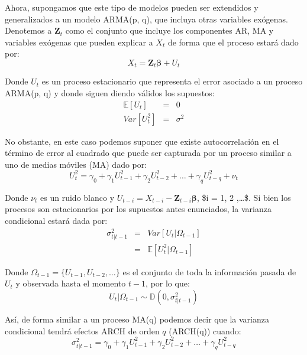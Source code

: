 \documentclass[
]{book}
\begin{document}
Ahora, supongamos que este tipo de modelos pueden ser extendidos y generalizados a un modelo ARMA(p, q), que incluya otras variables exógenas. Denotemos a \(\mathbf{Z}_t\) como el conjunto que incluye los componentes AR, MA y variables exógenas que pueden explicar a \(X_t\) de forma que el proceso estará dado por:
\begin{equation}
    X_t = \mathbf{Z}_t \boldsymbol{\beta} + U_t
\end{equation}

Donde \(U_t\) es un proceso estacionario que representa el error asociado a un proceso ARMA(p, q) y donde siguen diendo válidos los supuestos:
\begin{eqnarray*}
    \mathbb{E}[U_t] & = & 0 \\
    Var[U_t^2] & = & \sigma^2
\end{eqnarray*}

No obstante, en este caso podemos suponer que existe autocorrelación en el término de error al cuadrado que puede ser capturada por un proceso similar a uno de medias móviles (MA) dado por:
\begin{equation}
    U_t^2 = \gamma_0 + \gamma_1 U_{t-1}^2 + \gamma_2 U_{t-2}^2 + \ldots + \gamma_q U_{t-q}^2 + \nu_t
\end{equation}

Donde \(\nu_t\) es un ruido blanco y \(U_{t-i} = X_{t-i} - \mathbf{Z}_{t-i} \boldsymbol{\beta}\), \$i = 1, 2 ,\ldots \$. Si bien los procesos son estacionarios por los supuestos antes enunciados, la varianza condicional estará dada por:
\begin{eqnarray*}
    \sigma^2_{t | t-1} & = & Var[ U_t | \Omega_{t-1} ] \\
    & = & \mathbb{E}[ U^2_t | \Omega_{t-1} ]
\end{eqnarray*}

Donde \(\Omega_{t-1} = \{U_{t-1}, U_{t-2}, \ldots \}\) es el conjunto de toda la información pasada de \(U_t\) y observada hasta el momento \(t-1\), por lo que:
\begin{equation*}
    U_t | \Omega_{t-1} \sim \mathbb{D}(0, \sigma^2_{t | t-1})
\end{equation*}

Así, de forma similar a un proceso MA(q) podemos decir que la varianza condicional tendrá efectos ARCH de orden \(q\) (ARCH(q)) cuando:
\begin{equation}
    \sigma^2_{t | t-1} = \gamma_0 + \gamma_1 U_{t-1}^2 + \gamma_2 U_{t-2}^2 + \ldots + \gamma_q U_{t-q}^2
    \label{eq:ARCHEffect}
\end{equation}
\end{document}

